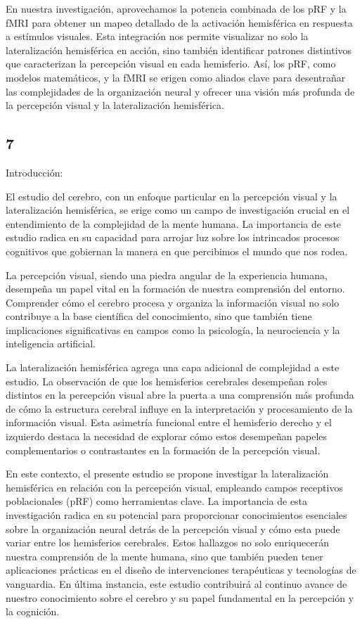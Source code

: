 \documentclass[12pt,oneside]{uhthesis}
\begin{document}
En nuestra investigación, aprovechamos la potencia combinada de los pRF y la fMRI para obtener un mapeo detallado de la activación hemisférica en respuesta a estímulos visuales. Esta integración nos permite visualizar no solo la lateralización hemisférica en acción, sino también identificar patrones distintivos que caracterizan la percepción visual en cada hemisferio. Así, los pRF, como modelos matemáticos, y la fMRI se erigen como aliados clave para desentrañar las complejidades de la organización neural y ofrecer una visión más profunda de la percepción visual y la lateralización hemisférica.

\subsection{7}

Introducción:

El estudio del cerebro, con un enfoque particular en la percepción visual y la lateralización hemisférica, se erige como un campo de investigación crucial en el entendimiento de la complejidad de la mente humana. La importancia de este estudio radica en su capacidad para arrojar luz sobre los intrincados procesos cognitivos que gobiernan la manera en que percibimos el mundo que nos rodea.

La percepción visual, siendo una piedra angular de la experiencia humana, desempeña un papel vital en la formación de nuestra comprensión del entorno. Comprender cómo el cerebro procesa y organiza la información visual no solo contribuye a la base científica del conocimiento, sino que también tiene implicaciones significativas en campos como la psicología, la neurociencia y la inteligencia artificial.

La lateralización hemisférica agrega una capa adicional de complejidad a este estudio. La observación de que los hemisferios cerebrales desempeñan roles distintos en la percepción visual abre la puerta a una comprensión más profunda de cómo la estructura cerebral influye en la interpretación y procesamiento de la información visual. Esta asimetría funcional entre el hemisferio derecho y el izquierdo destaca la necesidad de explorar cómo estos desempeñan papeles complementarios o contrastantes en la formación de la percepción visual.

En este contexto, el presente estudio se propone investigar la lateralización hemisférica en relación con la percepción visual, empleando campos receptivos poblacionales (pRF) como herramientas clave. La importancia de esta investigación radica en su potencial para proporcionar conocimientos esenciales sobre la organización neural detrás de la percepción visual y cómo esta puede variar entre los hemisferios cerebrales. Estos hallazgos no solo enriquecerán nuestra comprensión de la mente humana, sino que también pueden tener aplicaciones prácticas en el diseño de intervenciones terapéuticas y tecnologías de vanguardia. En última instancia, este estudio contribuirá al continuo avance de nuestro conocimiento sobre el cerebro y su papel fundamental en la percepción y la cognición.
\end{document}

